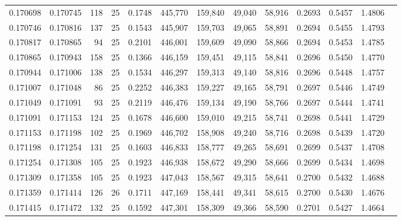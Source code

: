 \begin{tabular}{rrrrrrrrrrrrr}
0.170698 & 0.170745 &   118 &  25 &                                     0.1748 & 445,770 & 159,840 &  49,040 &  58,916 & 0.2693 & 0.5457 & 1.4806 \\
0.170746 & 0.170816 &   137 &  25 &                                     0.1543 & 445,907 & 159,703 &  49,065 &  58,891 & 0.2694 & 0.5455 & 1.4793 \\
0.170817 & 0.170865 &    94 &  25 &                                     0.2101 & 446,001 & 159,609 &  49,090 &  58,866 & 0.2694 & 0.5453 & 1.4785 \\
0.170865 & 0.170943 &   158 &  25 &                                     0.1366 & 446,159 & 159,451 &  49,115 &  58,841 & 0.2696 & 0.5450 & 1.4770 \\
0.170944 & 0.171006 &   138 &  25 &                                     0.1534 & 446,297 & 159,313 &  49,140 &  58,816 & 0.2696 & 0.5448 & 1.4757 \\
0.171007 & 0.171048 &    86 &  25 &                                     0.2252 & 446,383 & 159,227 &  49,165 &  58,791 & 0.2697 & 0.5446 & 1.4749 \\
0.171049 & 0.171091 &    93 &  25 &                                     0.2119 & 446,476 & 159,134 &  49,190 &  58,766 & 0.2697 & 0.5444 & 1.4741 \\
0.171091 & 0.171153 &   124 &  25 &                                     0.1678 & 446,600 & 159,010 &  49,215 &  58,741 & 0.2698 & 0.5441 & 1.4729 \\
0.171153 & 0.171198 &   102 &  25 &                                     0.1969 & 446,702 & 158,908 &  49,240 &  58,716 & 0.2698 & 0.5439 & 1.4720 \\
0.171198 & 0.171254 &   131 &  25 &                                     0.1603 & 446,833 & 158,777 &  49,265 &  58,691 & 0.2699 & 0.5437 & 1.4708 \\
0.171254 & 0.171308 &   105 &  25 &                                     0.1923 & 446,938 & 158,672 &  49,290 &  58,666 & 0.2699 & 0.5434 & 1.4698 \\
0.171309 & 0.171358 &   105 &  25 &                                     0.1923 & 447,043 & 158,567 &  49,315 &  58,641 & 0.2700 & 0.5432 & 1.4688 \\
0.171359 & 0.171414 &   126 &  26 &                                     0.1711 & 447,169 & 158,441 &  49,341 &  58,615 & 0.2700 & 0.5430 & 1.4676 \\
0.171415 & 0.171472 &   132 &  25 &                                     0.1592 & 447,301 & 158,309 &  49,366 &  58,590 & 0.2701 & 0.5427 & 1.4664 \\

\end{tabular}
